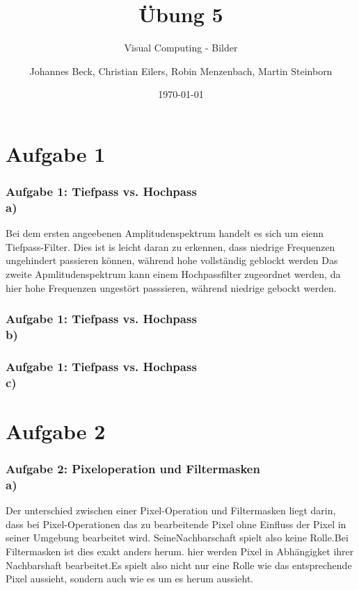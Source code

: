 \documentclass[accentcolor=tud1a,colorbacktitle,inverttitle,landscape,german,presentation,t]{tudbeamer}
\begin{document}
\title{\"Ubung 5}
\subtitle{Visual Computing - Bilder}

\author[Johannes Beck, Christian Eilers, Robin Menzenbach, Martin Steinborn]{Johannes Beck, Christian Eilers, Robin Menzenbach, Martin Steinborn}


\date{\today}

\begin{titleframe}
\end{titleframe}

\section{Aufgabe 1}
	\begin{frame}
		\frametitle{Aufgabe 1: Tiefpass vs. Hochpass \\ a)}
		Bei dem ersten angeebenen Amplitudenspektrum handelt es sich um eienn Tiefpass-Filter. Dies ist is leicht daran zu erkennen, dass niedrige Frequenzen ungehindert passieren können, während hohe vollständig geblockt werden
		Das zweite Apmlitudenspektrum kann einem Hochpassfilter zugeordnet werden, da hier hohe Frequenzen ungestört passsieren, während niedrige gebockt werden.
	\end{frame}
	
	\begin{frame}
	\frametitle{Aufgabe 1: Tiefpass vs. Hochpass \\ b)}
	
	
	\end{frame}

	\begin{frame}
	\frametitle{Aufgabe 1: Tiefpass vs. Hochpass \\ c)}
	
	
	\end{frame}
\section{Aufgabe 2}
	\begin{frame}
		\frametitle{Aufgabe 2: Pixeloperation und Filtermasken \\ a)}
			\label{2_a}
			Der unterschied zwischen einer Pixel-Operation und Filtermasken liegt darin, dass bei Pixel-Operationen das zu bearbeitende Pixel ohne Einfluss der Pixel in seiner Umgebung bearbeitet wird. SeineNachbarschaft spielt also keine Rolle.Bei Filtermasken ist dies exakt anders herum. hier werden Pixel in Abhängigket ihrer Nachbarshaft bearbeitet.Es spielt also nicht nur eine Rolle wie das entsprechende Pixel aussieht, sondern auch wie es um es herum aussieht.
	\end{frame}
\end{document}
